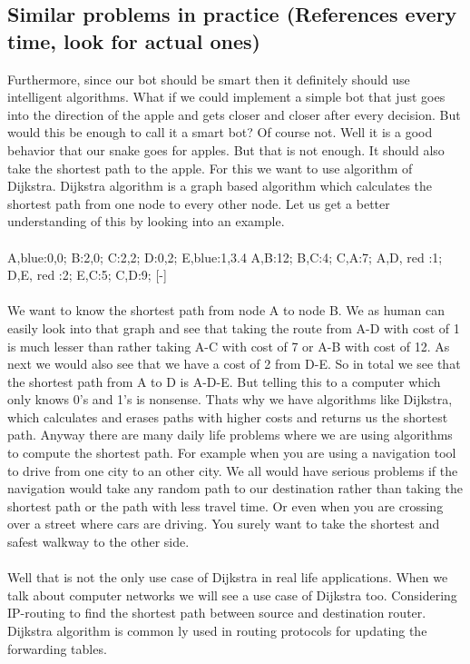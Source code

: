 \documentclass[a4paper,12pt]{article}
\begin{document}
\subsection{Similar problems in practice (References every time, look for actual ones)}
Furthermore, since our bot should be smart then it definitely should use intelligent algorithms. What if we could implement a simple bot that just goes into the direction of the apple and gets closer and closer after every decision. But would this be enough to call it a smart bot? Of course not. Well it is a good behavior that our snake goes for apples.  But that is not enough. It should also take the shortest path to the apple. For this we want to use algorithm of Dijkstra. Dijkstra algorithm is a graph based algorithm which calculates the shortest path from one node to every other node. Let us get a better understanding of this by looking into an example.\\
\\
{
A,blue:0,0;
B:2,0;
C:2,2;
D:0,2;
E,blue:1,3.4
}
{
A,B:12;
B,C:4;
C,A:7; 
A,D, red :1;
D,E, red :2; 
E,C:5;
C,D:9;
}[-]
\mygraph{}
\\
\\We want to know the shortest path from node A to node B. We as human can easily look into that graph and see that taking the route from A-D with cost of 1 is much lesser than rather taking A-C with cost of 7 or A-B with cost of 12. As next we would also see that we have a cost of 2 from D-E. So in total we see that the shortest path from A to D is A-D-E. But telling this to a computer which only knows 0's and 1's is nonsense. Thats why we have algorithms like Dijkstra, which calculates and erases paths with higher costs and returns us the shortest path. Anyway there are many daily life problems where we are using algorithms to compute the shortest path. For example when you are using a navigation tool to drive from one city to an other city. We all would have serious problems if the navigation would take any random path to our destination rather than taking the shortest path or the path with less travel time. Or even when you are crossing over a street where cars are driving. You surely want to take the shortest and safest walkway to the other side.\\
\\Well that is not the only use case of Dijkstra in real life applications. When we talk about computer networks we will see a use case of Dijkstra too. Considering IP-routing to find the shortest path between source and destination router. Dijkstra algorithm is common ly used in routing protocols for updating the forwarding tables.\\
\end{document}

